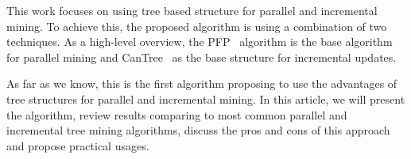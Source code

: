 This work focuses on using tree based structure for parallel and incremental mining. To achieve this, the proposed algorithm is using a combination of two techniques. As a high-level overview, the PFP~\cite{li2008pfp} algorithm is the base algorithm for parallel mining and CanTree~\cite{leung2005cantree} as the base structure for incremental updates.

As far as we know, this is the first algorithm proposing to use the advantages of tree structures for parallel and incremental mining. In this article, we will present the algorithm, review results comparing to most common parallel and incremental tree mining algorithms, discuss the pros and cons of this approach and propose practical usages.

